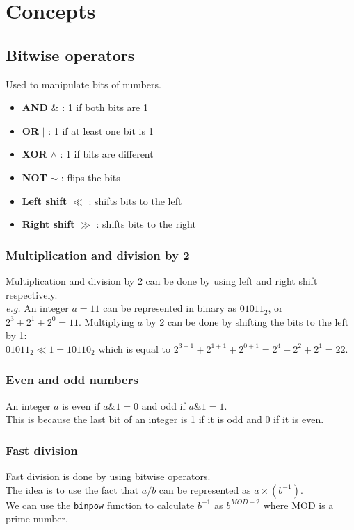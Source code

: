 \documentclass{cpnote}
\begin{document}
\section{Concepts}
\subsection{Bitwise operators}
Used to manipulate bits of numbers.

\begin{itemize}
    \item \textbf{AND} \& : 1 if both bits are 1
    \item \textbf{OR} $|$ : 1 if at least one bit is 1
    \item \textbf{XOR} $\wedge$ : 1 if bits are different
    \item \textbf{NOT} $\sim$ : flips the bits
    \item \textbf{Left shift} $\ll$ : shifts bits to the left
    \item \textbf{Right shift} $\gg$ : shifts bits to the right
\end{itemize}

\subsubsection{Multiplication and division by 2}
Multiplication and division by 2 can be done by using left and right shift respectively. \\
\textit{e.g.} An integer \(a = 11\) can be represented in binary as \(01011_2\), or \(2^3 + 2^1 + 2^0 = 11\).
Multiplying \(a\) by 2 can be done by shifting the bits to the left by 1: \\
\(01011_2 \ll 1 = 10110_2\) which is equal to \(2^{3 + 1} + 2^{1 + 1} + 2^{0 + 1} = 2^4 + 2^2 + 2^1 = 22\). \\

\subsubsection{Even and odd numbers}
An integer \(a\) is even if \(a \& 1 = 0\) and odd if \(a \& 1 = 1\). \\
This is because the last bit of an integer is 1 if it is odd and 0 if it is even. 

\subsubsection{Fast division}
Fast division is done by using bitwise operators. \\
The idea is to use the fact that \(a / b\) can be represented as \(a \times (b^{-1})\). \\
We can use the \texttt{binpow} function to calculate \(b^{-1}\) as \(b^{MOD - 2}\) where MOD is a prime number. \\
\end{document}
